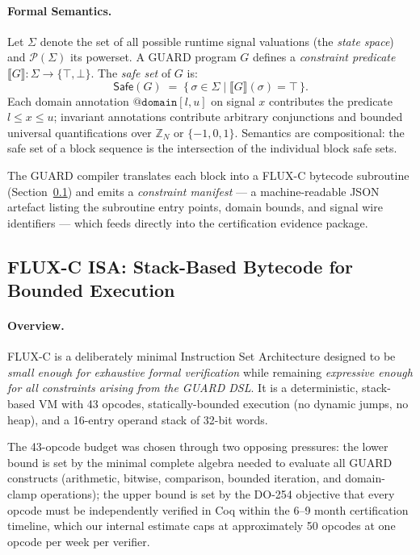 \documentclass[conference]{IEEEtran}
\begin{document}
\paragraph{Formal Semantics.}
Let $\Sigma$ denote the set of all possible runtime signal valuations (the
\emph{state space}) and $\mathcal{P}(\Sigma)$ its powerset.
A GUARD program $G$ defines a \emph{constraint predicate}
$\llbracket G \rrbracket : \Sigma \to \{\top, \bot\}$.
The \emph{safe set} of $G$ is:
\[
  \mathsf{Safe}(G) \;=\; \{\, \sigma \in \Sigma \mid \llbracket G \rrbracket(\sigma) = \top \,\}.
\]
Each domain annotation $\texttt{@domain}[l, u]$ on signal $x$ contributes
the predicate $l \le x \le u$; invariant annotations contribute arbitrary
conjunctions and bounded universal quantifications over $\mathbb{Z}_N$ or $\{-1,0,1\}$.
Semantics are compositional: the safe set of a block sequence is the
intersection of the individual block safe sets.

The GUARD compiler translates each block into a FLUX-C bytecode subroutine
(Section~\ref{sec:fluxc}) and emits a \emph{constraint manifest} — a
machine-readable JSON artefact listing the subroutine entry points,
domain bounds, and signal wire identifiers — which feeds directly into the
certification evidence package.

\subsection{FLUX-C ISA: Stack-Based Bytecode for Bounded Execution}
\label{sec:fluxc}

\paragraph{Overview.}
FLUX-C is a deliberately minimal Instruction Set Architecture designed to
be \emph{small enough for exhaustive formal verification} while remaining
\emph{expressive enough for all constraints arising from the GUARD DSL}.
It is a deterministic, stack-based VM with 43 opcodes, statically-bounded
execution (no dynamic jumps, no heap), and a 16-entry operand stack of
32-bit words.

The 43-opcode budget was chosen through two opposing pressures: the lower
bound is set by the minimal complete algebra needed to evaluate all GUARD
constructs (arithmetic, bitwise, comparison, bounded iteration, and
domain-clamp operations); the upper bound is set by the DO-254 objective
that every opcode must be independently verified in Coq within the
6–9 month certification timeline, which our internal estimate caps at
approximately 50 opcodes at one opcode per week per verifier.
\end{document}
